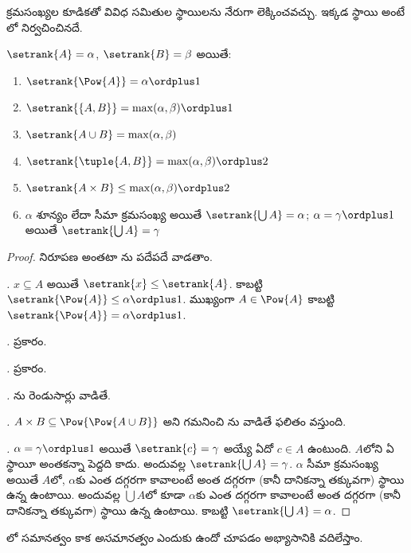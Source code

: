 \documentclass[../../../include/open-logic-section]{subfiles}
\begin{document}

క్రమసంఖ్యల కూడికతో వివిధ సమితుల స్థాయిలను నేరుగా
లెక్కించవచ్చు. ఇక్కడ స్థాయి అంటే లో
నిర్వచించినదే.

\begin{lem}
$\setrank{A} = \alpha$, $\setrank{B} = \beta$ అయితే:
\begin{enumerate}
	\item{} $\setrank{\Pow{A}} = \alpha\ordplus 1$
	\item{} $\setrank{\{A, B\}} = \max(\alpha,
	\beta) \ordplus 1$
	\item{} $\setrank{A \cup B} = \max(\alpha,
	\beta)$
	\item{} $\setrank{\tuple{A,B}} = \max(\alpha,
	\beta) \ordplus  2$
	\item{} $\setrank{A \times B} \leq \max(\alpha,
	\beta) \ordplus  2$
	\item{} $\alpha$ శూన్యం లేదా సీమా క్రమసంఖ్య అయితే $\setrank{\bigcup A} = \alpha$; $\alpha = \gamma\ordplus 1$ అయితే $\setrank{\bigcup A} = \gamma$
\end{enumerate}
\end{lem}

\begin{proof}
నిరూపణ అంతటా ను పదేపదే వాడతాం.

\emph{.} $x \subseteq A$ అయితే $\setrank{x} \leq
\setrank{A}$. కాబట్టి $\setrank{\Pow{A}} \leq \alpha \ordplus  1$. ముఖ్యంగా $A
\in \Pow{A}$ కాబట్టి $\setrank{\Pow{A}} = \alpha \ordplus  1$.

\emph{.}  ప్రకారం.

\emph{.}  ప్రకారం.

\emph{.} ను రెండుసార్లు వాడితే.

\emph{.} $A \times B \subseteq
\Pow{\Pow{A \cup B}}$ అని గమనించి ను వాడితే ఫలితం వస్తుంది.

\emph{.} $\alpha = \gamma\ordplus 1$ అయితే $\setrank{c} = \gamma$ అయ్యే ఏదో $c \in A$ ఉంటుంది. $A$లోని ఏ  స్థాయీ అంతకన్నా పెద్దది కాదు. అందువల్ల $\setrank{\bigcup A} = \gamma$. $\alpha$ సీమా క్రమసంఖ్య అయితే $A$లో, $\alpha$కు ఎంత దగ్గరగా కావాలంటే అంత దగ్గరగా (కానీ దానికన్నా తక్కువగా) స్థాయి ఉన్న  ఉంటాయి. అందువల్ల $\bigcup A$లో కూడా $\alpha$కు ఎంత దగ్గరగా కావాలంటే అంత దగ్గరగా (కానీ దానికన్నా తక్కువగా) స్థాయి ఉన్న  ఉంటాయి. కాబట్టి $\setrank{\bigcup A} = \alpha$.
\end{proof}
\noindent
{}లో సమానత్వం కాక \emph{అసమానత్వం} ఎందుకు ఉందో చూపడం అభ్యాసానికి వదిలేస్తాం.
\end{document}
